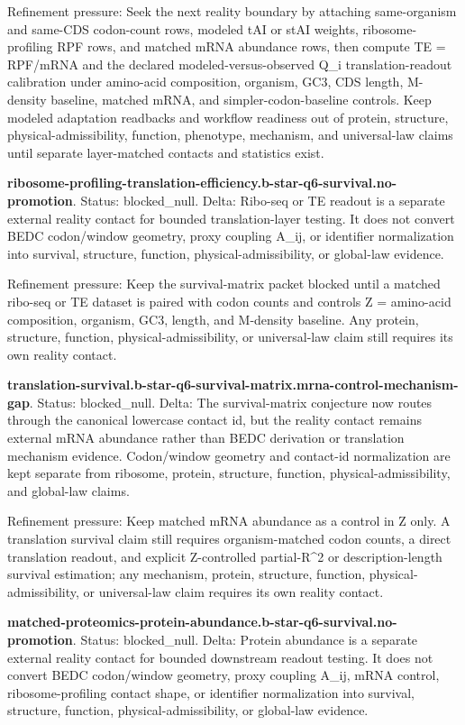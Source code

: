 Refinement pressure: Seek the next reality boundary by attaching same-organism and same-CDS codon-count rows, modeled tAI or stAI weights, ribosome-profiling RPF rows, and matched mRNA abundance rows, then compute TE = RPF/mRNA and the declared modeled-versus-observed Q\_i translation-readout calibration under amino-acid composition, organism, GC3, CDS length, M-density baseline, matched mRNA, and simpler-codon-baseline controls. Keep modeled adaptation readbacks and workflow readiness out of protein, structure, physical-admissibility, function, phenotype, mechanism, and universal-law claims until separate layer-matched contacts and statistics exist.

\textbf{ribosome-profiling-translation-efficiency.b-star-q6-survival.no-promotion}. Status: blocked\_null. Delta: Ribo-seq or TE readout is a separate external reality contact for bounded translation-layer testing. It does not convert BEDC codon/window geometry, proxy coupling A\_ij, or identifier normalization into survival, structure, function, physical-admissibility, or global-law evidence.

Refinement pressure: Keep the survival-matrix packet blocked until a matched ribo-seq or TE dataset is paired with codon counts and controls Z = amino-acid composition, organism, GC3, length, and M-density baseline. Any protein, structure, function, physical-admissibility, or universal-law claim still requires its own reality contact.

\textbf{translation-survival.b-star-q6-survival-matrix.mrna-control-mechanism-gap}. Status: blocked\_null. Delta: The survival-matrix conjecture now routes through the canonical lowercase contact id, but the reality contact remains external mRNA abundance rather than BEDC derivation or translation mechanism evidence. Codon/window geometry and contact-id normalization are kept separate from ribosome, protein, structure, function, physical-admissibility, and global-law claims.

Refinement pressure: Keep matched mRNA abundance as a control in Z only. A translation survival claim still requires organism-matched codon counts, a direct translation readout, and explicit Z-controlled partial-R\textasciicircum{}2 or description-length survival estimation; any mechanism, protein, structure, function, physical-admissibility, or universal-law claim requires its own reality contact.

\textbf{matched-proteomics-protein-abundance.b-star-q6-survival.no-promotion}. Status: blocked\_null. Delta: Protein abundance is a separate external reality contact for bounded downstream readout testing. It does not convert BEDC codon/window geometry, proxy coupling A\_ij, mRNA control, ribosome-profiling contact shape, or identifier normalization into survival, structure, function, physical-admissibility, or global-law evidence.

